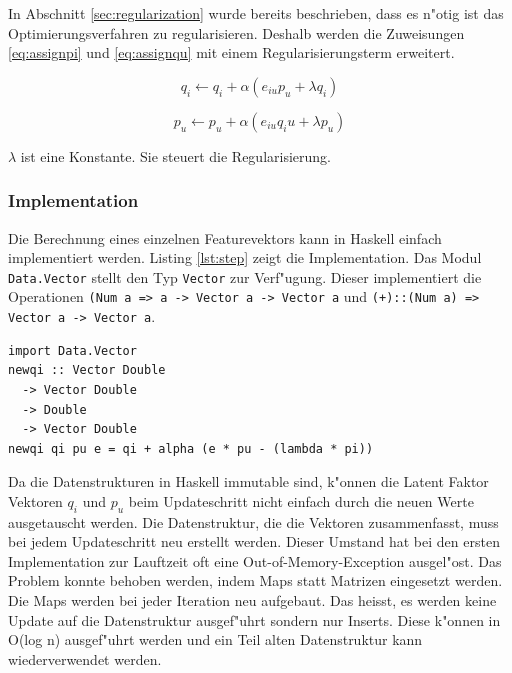 \documentclass[a4paper, 12pt]{article}
\begin{document}
In Abschnitt \ref{sec:regularization} wurde bereits beschrieben, dass es n"otig ist das Optimierungsverfahren zu regularisieren. Deshalb werden die Zuweisungen \ref{eq:assignpi} und \ref{eq:assignqu} mit einem Regularisierungsterm erweitert.

\begin{equation}
  \label{eq:assign2}
  q_i \leftarrow q_i + \alpha (e_{iu} p_u + \lambda q_i)
\end{equation}

\begin{equation}
  \label{eq:assign3}
    p_u \leftarrow p_u + \alpha (e_{iu} q_iu + \lambda p_u)
\end{equation}

$\lambda$ ist eine Konstante. Sie steuert die Regularisierung. 

\subsubsection{Implementation}
\label{sec:sgdimpl}

Die Berechnung eines einzelnen Featurevektors kann in Haskell einfach implementiert werden. Listing \ref{lst:step} zeigt die Implementation. Das Modul \verb|Data.Vector| stellt den Typ \verb|Vector| zur Verf"ugung. Dieser implementiert die Operationen \verb|(Num a => a -> Vector a -> Vector a| und \verb|(+)::(Num a) => Vector a -> Vector a|.

\begin{lstlisting}[caption=Berechnung eines Featurevektors, label={lst:step}]
import Data.Vector 
newqi :: Vector Double
  -> Vector Double
  -> Double
  -> Vector Double
newqi qi pu e = qi + alpha (e * pu - (lambda * pi))
\end{lstlisting}

Da die Datenstrukturen in Haskell immutable sind, k"onnen die Latent Faktor Vektoren $q_i$ und $p_u$ beim Updateschritt nicht einfach durch die neuen Werte ausgetauscht werden. Die Datenstruktur, die die Vektoren zusammenfasst, muss bei jedem Updateschritt neu erstellt werden. Dieser Umstand hat bei den ersten Implementation zur Lauftzeit oft eine Out-of-Memory-Exception ausgel"ost. Das Problem konnte behoben werden, indem Maps statt Matrizen eingesetzt werden. Die Maps werden bei jeder Iteration neu aufgebaut. Das heisst, es werden keine Update auf die Datenstruktur ausgef"uhrt sondern nur Inserts. Diese k"onnen in O(log n) ausgef"uhrt werden und ein Teil alten Datenstruktur kann wiederverwendet werden.
\end{document}

